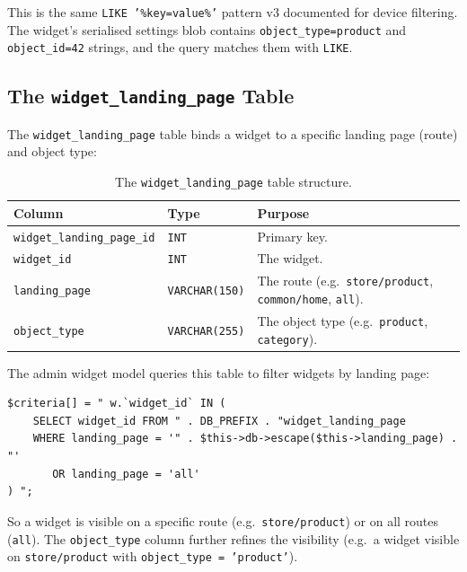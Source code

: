 \documentclass[11pt,a4paper]{article}
\begin{document}
This is the same \texttt{LIKE '\%key=value\%'} pattern v3 documented for
device filtering. The widget's serialised settings blob contains
\texttt{object\_type=product} and \texttt{object\_id=42} strings, and
the query matches them with \texttt{LIKE}.

\subsection{The \texttt{widget\_landing\_page} Table}

The \texttt{widget\_landing\_page} table binds a widget to a specific
landing page (route) and object type:

\begin{table}[htbp]
\centering
\caption{The \texttt{widget\_landing\_page} table structure.}\label{tab:wlp}
\small
\begin{tabularx}{\columnwidth}{llX}
\toprule
\textbf{Column} & \textbf{Type} & \textbf{Purpose} \\
\midrule
\texttt{widget\_landing\_page\_id} & \texttt{INT} & Primary key. \\
\texttt{widget\_id}     & \texttt{INT} & The widget. \\
\texttt{landing\_page}  & \texttt{VARCHAR(150)} & The route (e.g.\ \texttt{store/product}, \texttt{common/home}, \texttt{all}). \\
\texttt{object\_type}   & \texttt{VARCHAR(255)} & The object type (e.g.\ \texttt{product}, \texttt{category}). \\
\bottomrule
\end{tabularx}
\end{table}

The admin widget model queries this table to filter widgets by landing
page:

\begin{lstlisting}[caption={Admin widget model: \texttt{widget\_landing\_page} filter.},label={lst:wlp-filter}]
$criteria[] = " w.`widget_id` IN (
    SELECT widget_id FROM " . DB_PREFIX . "widget_landing_page
    WHERE landing_page = '" . $this->db->escape($this->landing_page) . "'
       OR landing_page = 'all'
) ";
\end{lstlisting}

So a widget is visible on a specific route (e.g.\
\texttt{store/product}) or on all routes (\texttt{all}). The
\texttt{object\_type} column further refines the visibility (e.g.\ a
widget visible on \texttt{store/product} with
\texttt{object\_type = 'product'}).
\end{document}
